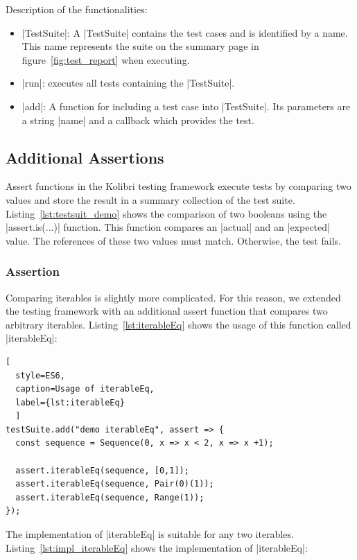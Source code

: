 Description of the functionalities: 

\begin{itemize}
  \item{|TestSuite|: A |TestSuite| contains the test cases and is identified by a
    name. This name represents the suite on the summary page in 
  figure~\ref{fig:test_report} when executing.}
  \item{|run|: executes all tests containing the |TestSuite|.}
  \item{|add|: A function for including a test case into |TestSuite|. Its
      parameters are a string |name| and a callback which provides the test.}
\end{itemize}

\subsection{Additional Assertions}
\label{sub:Additional Assertions}

Assert functions in the Kolibri testing framework execute tests by comparing
two values and store the result in a summary collection of the test suite.
Listing~\ref{lst:testsuit_demo} shows the comparison of two booleans using the
|assert.is(...)| function.
This function compares an |actual| and an |expected| value. The references of
these two values must match. Otherwise, the test fails.

\subsubsection{Assertion}
\label{subsub:Assertion for Iterables}
Comparing iterables is slightly more complicated. For this reason, we extended
the testing framework with an additional assert function that compares two
arbitrary iterables. Listing~\ref{lst:iterableEq} shows the usage of this
function called |iterableEq|:

\begin{lstlisting}[
  style=ES6, 
  caption=Usage of iterableEq,
  label={lst:iterableEq}
  ]
testSuite.add("demo iterableEq", assert => {
  const sequence = Sequence(0, x => x < 2, x => x +1);

  assert.iterableEq(sequence, [0,1]);
  assert.iterableEq(sequence, Pair(0)(1));
  assert.iterableEq(sequence, Range(1));
});  
\end{lstlisting}

The implementation of |iterableEq| is suitable for any two iterables.
Listing~\ref{lst:impl_iterableEq} shows the implementation of |iterableEq|:

